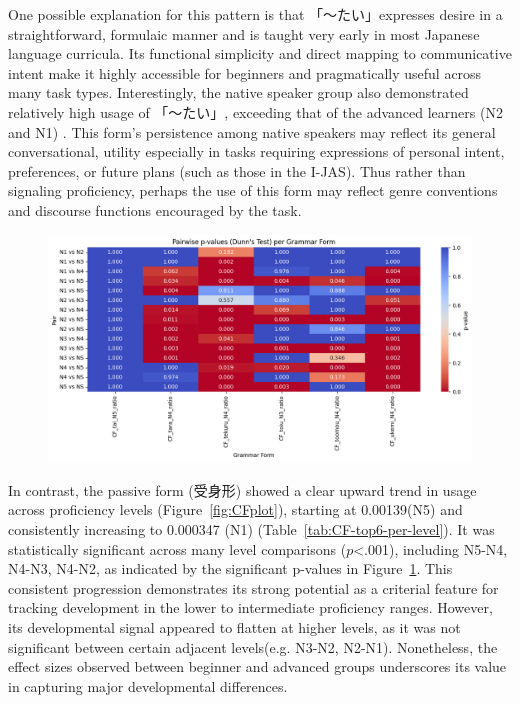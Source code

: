 One possible
explanation for this pattern is that 「〜たい」expresses desire in a straightforward, formulaic manner and is taught very
early in most Japanese language curricula. Its functional simplicity and direct mapping to communicative intent make
it highly accessible for beginners and pragmatically useful across many task types. Interestingly, the native
speaker group also demonstrated relatively high usage of 「〜たい」, exceeding that of the advanced learners (N2 and N1)
. This form's persistence among native speakers may reflect its general conversational, utility especially in tasks
requiring expressions of personal intent, preferences, or future plans (such as those in the I-JAS). Thus
rather than
signaling proficiency, perhaps the use of this form may reflect genre conventions and discourse functions encouraged
by the task.


\begin{figure}[h!]
\centering
\includegraphics[scale=.4]{img/CFheatmap}
\caption[Heatmap of top 5 grammar forms]{}
\label{fig:CFheatmap}
\end{figure}
In
contrast, the
passive form (受身形) showed a clear upward trend in usage across proficiency levels (Figure~\ref{fig:CFplot}),
starting at 0.00139(N5) and consistently increasing to 0.000347 (N1) (Table~\ref{tab:CF-top6-per-level}). It was statistically
significant
across many level comparisons ($p$<.001), including N5-N4, N4-N3, N4-N2, as indicated by the significant p-values in
Figure~\ref{fig:CFheatmap}. This consistent progression demonstrates its strong potential as a criterial feature
for
tracking
development in the lower to intermediate
proficiency ranges. However, its developmental signal appeared to flatten at higher levels, as it was not significant
between certain adjacent levels(e.g. N3-N2, N2-N1). Nonetheless, the effect sizes observed between beginner
and advanced groups underscores its value in capturing major developmental differences.

